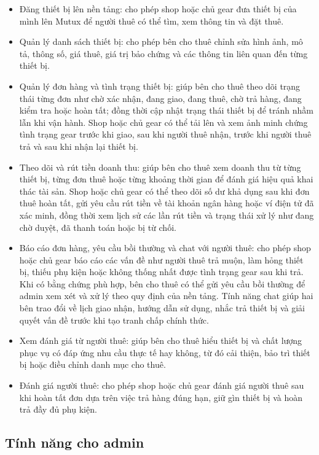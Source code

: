 \begin{itemize}
    \item Đăng thiết bị lên nền tảng: cho phép shop hoặc chủ gear đưa thiết bị của mình lên Mutux để người thuê có thể tìm, xem thông tin và đặt thuê.
    \item Quản lý danh sách thiết bị: cho phép bên cho thuê chỉnh sửa hình ảnh, mô tả, thông số, giá thuê, giá trị bảo chứng và các thông tin liên quan đến từng thiết bị.
    \item Quản lý đơn hàng và tình trạng thiết bị: giúp bên cho thuê theo dõi trạng thái từng đơn như chờ xác nhận, đang giao, đang thuê, chờ trả hàng, đang kiểm tra hoặc hoàn tất; đồng thời cập nhật trạng thái thiết bị để tránh nhầm lẫn khi vận hành. Shop hoặc chủ gear có thể tải lên và xem ảnh minh chứng tình trạng gear trước khi giao, sau khi người thuê nhận, trước khi người thuê trả và sau khi nhận lại thiết bị.
    \item Theo dõi và rút tiền doanh thu: giúp bên cho thuê xem doanh thu từ từng thiết bị, từng đơn thuê hoặc từng khoảng thời gian để đánh giá hiệu quả khai thác tài sản. Shop hoặc chủ gear có thể theo dõi số dư khả dụng sau khi đơn thuê hoàn tất, gửi yêu cầu rút tiền về tài khoản ngân hàng hoặc ví điện tử đã xác minh, đồng thời xem lịch sử các lần rút tiền và trạng thái xử lý như đang chờ duyệt, đã thanh toán hoặc bị từ chối.
    \item Báo cáo đơn hàng, yêu cầu bồi thường và chat với người thuê: cho phép shop hoặc chủ gear báo cáo các vấn đề như người thuê trả muộn, làm hỏng thiết bị, thiếu phụ kiện hoặc không thống nhất được tình trạng gear sau khi trả. Khi có bằng chứng phù hợp, bên cho thuê có thể gửi yêu cầu bồi thường để admin xem xét và xử lý theo quy định của nền tảng. Tính năng chat giúp hai bên trao đổi về lịch giao nhận, hướng dẫn sử dụng, nhắc trả thiết bị và giải quyết vấn đề trước khi tạo tranh chấp chính thức.
    \item Xem đánh giá từ người thuê: giúp bên cho thuê hiểu thiết bị và chất lượng phục vụ có đáp ứng nhu cầu thực tế hay không, từ đó cải thiện, bảo trì thiết bị hoặc điều chỉnh danh mục cho thuê.
    \item Đánh giá người thuê: cho phép shop hoặc chủ gear đánh giá người thuê sau khi hoàn tất đơn dựa trên việc trả hàng đúng hạn, giữ gìn thiết bị và hoàn trả đầy đủ phụ kiện.
\end{itemize}


\subsection{Tính năng cho admin}


